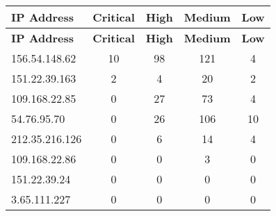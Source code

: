 \documentclass{article}
\begin{document}
\begin{longtable}{|>{\raggedright\arraybackslash}p{3cm}|c|c|c|c|}
    \hline
    \textbf{IP Address} & \textbf{Critical} & \textbf{High} & \textbf{Medium} & \textbf{Low} \\
    \hline
    \endfirsthead
    \hline
    \textbf{IP Address} & \textbf{Critical} & \textbf{High} & \textbf{Medium} & \textbf{Low} \\
    \hline
    \endhead
    \hline
    \endfoot
    \endlastfoot
    
    
    
    \rowcolor{lightred} %
    
    156.54.148.62 & 10 & 98 & 121 & 4 \\
    \hline
    
    
    \rowcolor{lightred} %
    
    151.22.39.163 & 2 & 4 & 20 & 2 \\
    \hline
    
    
    \rowcolor{lightred} %
    
    109.168.22.85 & 0 & 27 & 73 & 4 \\
    \hline
    
    
    \rowcolor{lightred} %
    
    54.76.95.70 & 0 & 26 & 106 & 10 \\
    \hline
    
    
    \rowcolor{lightred} %
    
    212.35.216.126 & 0 & 6 & 14 & 4 \\
    \hline
    
    
    \rowcolor{lightyellow} %
    
    109.168.22.86 & 0 & 0 & 3 & 0 \\
    \hline
    
    
    \rowcolor{lightgreen} %
    
    151.22.39.24 & 0 & 0 & 0 & 0 \\
    \hline
    
    
    \rowcolor{lightgreen} %
    
    3.65.111.227 & 0 & 0 & 0 & 0 \\
    \hline
    

\end{longtable}
\end{document}
